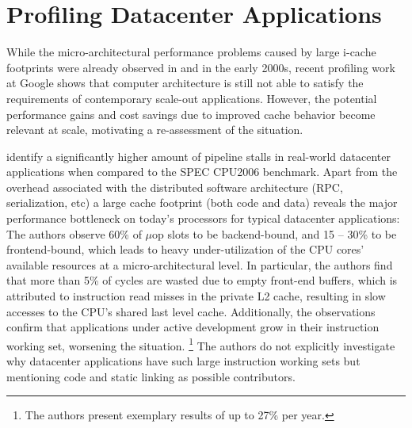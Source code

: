\documentclass[12pt,a4paper]{book}
\begin{document}
\section{Profiling Datacenter Applications}\label{ch:relwork:profiling}

While the micro-architectural performance problems caused by large i-cache footprints were already observed in \cite{cohort} and \cite{steps} in the early 2000s,
recent profiling work at Google shows that computer architecture is still not able to satisfy the requirements of contemporary scale-out applications.
However, the potential performance gains and cost savings due to improved cache behavior become relevant at scale, motivating a re-assessment of the situation.

\citeauthor*{kanev2015profiling} identify a significantly higher amount of pipeline stalls in real-world datacenter applications when compared to the SPEC CPU2006 benchmark.
Apart from the overhead associated with the distributed software architecture (RPC, serialization, etc) %
a large cache footprint (both code and data) reveals the major performance bottleneck on today's processors for typical datacenter applications:
The authors observe 60\% of $\mu$op slots to be backend-bound, and 15 -- 30\% to be frontend-bound, which leads to heavy under-utilization of the CPU cores' available resources at a micro-architectural level.
In particular, the authors find that more than 5\% of cycles are wasted due to empty front-end buffers, which is attributed to instruction read misses in the private L2 cache, resulting in slow accesses to the CPU's shared last level cache.
Additionally, the observations confirm that applications under active development grow in their instruction working set, worsening the situation.%
\footnote{The authors present exemplary results of up to 27\% per year.}
The authors do not explicitly investigate why datacenter applications have such large instruction working sets but mentioning  code and static linking as possible contributors.~\cite{kanev2015profiling}
\end{document}
